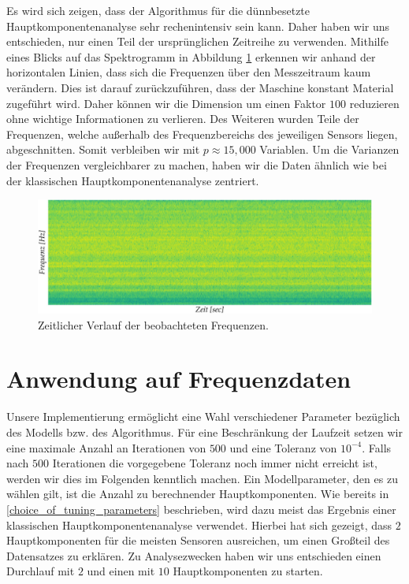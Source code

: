 Es wird sich zeigen, dass der Algorithmus für die dünnbesetzte Hauptkomponentenanalyse sehr rechenintensiv sein kann. Daher haben wir uns entschieden, nur einen Teil der ursprünglichen Zeitreihe zu verwenden. Mithilfe eines Blicks auf das Spektrogramm in Abbildung \ref{spectrogram} erkennen wir anhand der horizontalen Linien, dass sich die Frequenzen über den Messzeitraum kaum verändern. Dies ist darauf zurückzuführen, dass der Maschine konstant Material zugeführt wird. Daher können wir die Dimension um einen Faktor $100$ reduzieren ohne wichtige Informationen zu verlieren. Des Weiteren wurden Teile der Frequenzen, welche außerhalb des Frequenzbereichs des jeweiligen Sensors liegen, abgeschnitten. Somit verbleiben wir mit $p \approx 15,000$ Variablen. Um die Varianzen der Frequenzen vergleichbarer zu machen, haben wir die Daten ähnlich wie bei der klassischen Hauptkomponentenanalyse zentriert.

\begin{figure}
\centering
\includegraphics[width=\textwidth]{figures/Signal_5_time_frequency_change.jpg}
\caption{Zeitlicher Verlauf der beobachteten Frequenzen.}
\label{spectrogram}
\end{figure}



\section{Anwendung auf Frequenzdaten}
\label{application_frequency_data}

Unsere Implementierung ermöglicht eine Wahl verschiedener Parameter bezüglich des Modells bzw. des Algorithmus. Für eine Beschränkung der Laufzeit setzen wir eine maximale Anzahl an Iterationen von $500$ und eine Toleranz von $10^{-4}$. Falls nach $500$ Iterationen die vorgegebene Toleranz noch immer nicht erreicht ist, werden wir dies im Folgenden kenntlich machen. Ein Modellparameter, den es zu wählen gilt, ist die Anzahl zu berechnender Hauptkomponenten. Wie bereits in \ref{choice_of_tuning_parameters} beschrieben, wird dazu meist das Ergebnis einer klassischen Hauptkomponentenanalyse verwendet. Hierbei hat sich gezeigt, dass $2$ Hauptkomponenten für die meisten Sensoren ausreichen, um einen Großteil des Datensatzes zu erklären. Zu Analysezwecken haben wir uns entschieden einen Durchlauf mit $2$ und einen mit $10$ Hauptkomponenten zu starten. 

